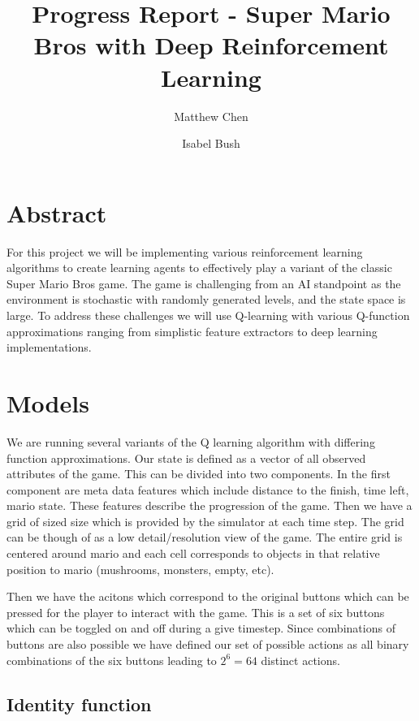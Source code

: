 \documentclass[12pt]{article}
\begin{document}
\nocite{*}

\title{Progress Report - Super Mario Bros with Deep Reinforcement Learning}

\author{
  Matthew Chen
  \and
  Isabel Bush
}
\date{}
\maketitle


\section{Abstract}

For this project we will be implementing various reinforcement learning algorithms to create learning agents to effectively play a variant of the classic Super Mario Bros game. The game is challenging from an AI standpoint as the environment is stochastic with randomly generated levels, and the state space is large. To address these challenges we will use Q-learning with various Q-function approximations ranging from simplistic feature extractors to deep learning implementations.


\section{Models}

We are running several variants of the Q learning algorithm with differing function approximations. Our state is defined as a vector of all observed attributes of the game. This can be divided into two components. In the first component are meta data features which include distance to the finish, time left, mario state. These features describe the progression of the game. Then we have a grid of sized size which is provided by the simulator at each time step. The grid can be though of as a low detail/resolution view of the game. The entire grid is centered around mario and each cell corresponds to objects in that relative position to mario (mushrooms, monsters, empty, etc).

Then we have the acitons which correspond to the original buttons which can be pressed for the player to interact with the game. This is a set of six buttons which can be toggled on and off during a give timestep. Since combinations of buttons are also possible we have defined our set of possible actions as all binary combinations of the six buttons leading to $2^6 = 64$ distinct actions.

\subsection{Identity function}
\end{document}
